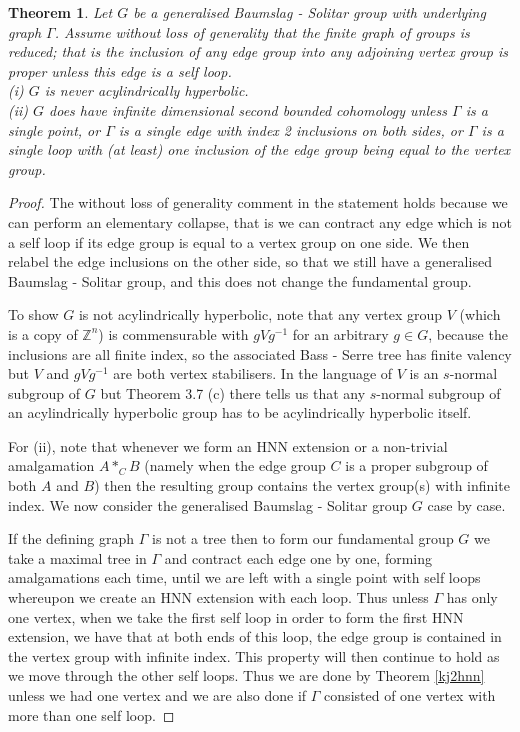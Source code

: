 \documentclass[11pt,reqno]{amsart}
\numberwithin{equation}{section}
\newcommand{\Z}{\mathbb{Z}}
\newtheorem{thm}{Theorem}[section]
\theoremstyle{definition}
\theoremstyle{remark}
\begin{document}
  \begin{thm} \label{gbs}
    Let $G$ be a generalised Baumslag - Solitar group with underlying graph
    $\Gamma$. Assume without loss
    of generality that the finite graph of groups is reduced; that is the
    inclusion of any edge group into any adjoining vertex group is proper
    unless this edge is a self loop.\\
    (i) $G$ is never acylindrically hyperbolic.\\
    (ii) $G$ does have infinite dimensional second bounded cohomology
    unless $\Gamma$ is a single point, or $\Gamma$ is a single
    edge with index 2 inclusions on both sides, or $\Gamma$ is a single
    loop with (at least) one inclusion of the edge group being equal to the
    vertex group.
 \end{thm}   
 \begin{proof}
   The without loss of generality comment in the statement holds because we can
   perform an elementary collapse, that is we can contract any edge which is
   not a self loop if its edge group is equal to a vertex group on one side.
   We then relabel the edge inclusions on the other side, so that we still
   have a generalised Baumslag - Solitar group, and this does not change
   the fundamental group.

   To show $G$ is not acylindrically hyperbolic, note that any vertex group
   $V$ (which is a copy of $\Z^n$) is commensurable with $gVg^{-1}$ for an
   arbitrary $g\in G$, because the inclusions are all finite index, so the
   associated Bass - Serre tree has finite valency but $V$ and $gVg^{-1}$
   are both vertex stabilisers. In the language of \cite{motr} $V$ is
   an $s$-normal subgroup of $G$ but Theorem 3.7 (c) there tells us that any
   $s$-normal subgroup of an acylindrically hyperbolic group has to be
   acylindrically hyperbolic itself.

   For (ii), note that whenever we form an HNN extension or a non-trivial
   amalgamation $A*_CB$ (namely when the edge group $C$ is a proper subgroup
   of both $A$ and $B$) then the resulting group contains the vertex group(s)
   with infinite index. We now consider the generalised Baumslag - Solitar
   group $G$ case by case.

   If the defining graph $\Gamma$ is not a tree then to form our fundamental
   group $G$ we take a maximal tree in $\Gamma$ and contract each edge one
   by one, forming amalgamations each time, until we are left with a single
   point with self loops whereupon we create an HNN extension with each
   loop. Thus unless $\Gamma$ has only one vertex, when we take the first
   self loop in order to form the first HNN extension, we have that at both
   ends of this loop, the edge group is contained in the vertex group with
   infinite index. This property will then continue to hold as we move through
   the other self loops. Thus we are done by Theorem \ref{kj2hnn} unless
   we had one vertex and we are also done if $\Gamma$ consisted of one
   vertex with more than one self loop.


\end{proof}
\end{document}
